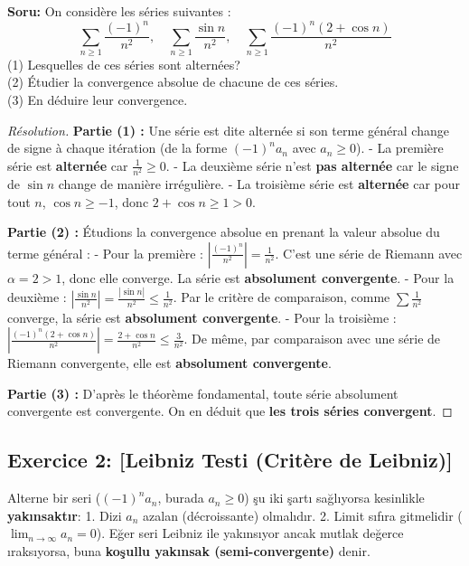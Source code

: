 \documentclass[12pt,a4paper]{report}
\begin{document}
\textbf{Soru:}
On considère les séries suivantes :
\[ \sum_{n \ge 1} \frac{(-1)^n}{n^2}, \quad \sum_{n \ge 1} \frac{\sin n}{n^2}, \quad \sum_{n \ge 1} \frac{(-1)^n(2 + \cos n)}{n^2} \]
(1) Lesquelles de ces séries sont alternées?\\
(2) Étudier la convergence absolue de chacune de ces séries.\\
(3) En déduire leur convergence.

\begin{proof}[Résolution]
\textbf{Partie (1) :} Une série est dite alternée si son terme général change de signe à chaque itération (de la forme $(-1)^n a_n$ avec $a_n \ge 0$).
- La première série est \textbf{alternée} car $\frac{1}{n^2} \ge 0$.
- La deuxième série n'est \textbf{pas alternée} car le signe de $\sin n$ change de manière irrégulière.
- La troisième série est \textbf{alternée} car pour tout $n$, $\cos n \ge -1$, donc $2 + \cos n \ge 1 > 0$.

\textbf{Partie (2) :} Étudions la convergence absolue en prenant la valeur absolue du terme général :
- Pour la première : $\left| \frac{(-1)^n}{n^2} \right| = \frac{1}{n^2}$. C'est une série de Riemann avec $\alpha = 2 > 1$, donc elle converge. La série est \textbf{absolument convergente}.
- Pour la deuxième : $\left| \frac{\sin n}{n^2} \right| = \frac{|\sin n|}{n^2} \le \frac{1}{n^2}$. Par le critère de comparaison, comme $\sum \frac{1}{n^2}$ converge, la série est \textbf{absolument convergente}.
- Pour la troisième : $\left| \frac{(-1)^n(2 + \cos n)}{n^2} \right| = \frac{2 + \cos n}{n^2} \le \frac{3}{n^2}$. De même, par comparaison avec une série de Riemann convergente, elle est \textbf{absolument convergente}.

\textbf{Partie (3) :} D'après le théorème fondamental, toute série absolument convergente est convergente. On en déduit que \textbf{les trois séries convergent}.
\end{proof}

\subsection*{Exercice 2: [Leibniz Testi (Critère de Leibniz)]}

\begin{tcolorbox}[colback=purple!5!white,colframe=purple!75!black,title=Hatırlatma (Rappel): Alterne Seriler İçin Leibniz Kriteri]
Alterne bir seri ($(-1)^n a_n$, burada $a_n \ge 0$) şu iki şartı sağlıyorsa kesinlikle \textbf{yakınsaktır}:
1. Dizi $a_n$ azalan (décroissante) olmalıdır.
2. Limit sıfıra gitmelidir ($\lim_{n \to \infty} a_n = 0$).
Eğer seri Leibniz ile yakınsıyor ancak mutlak değerce ıraksıyorsa, buna \textbf{koşullu yakınsak (semi-convergente)} denir.
\end{tcolorbox}
\end{document}
